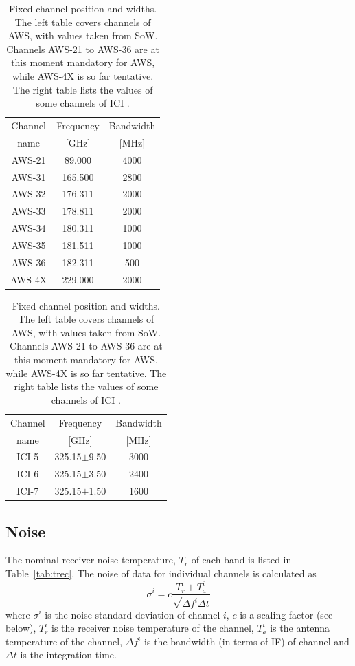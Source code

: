 \documentclass[12pt]{article}
\begin{document}
\begin{table}[!b]
  \begin{minipage}[b]{0.5\linewidth}
  \centering  
  \begin{tabular}[c]{c|c|c}
    Channel & Frequency   & Bandwidth \\
    name    & [GHz] &  [MHz] \\
    \hline
    AWS-21  & \phantom{0}89.000 & 4000\\
    AWS-31  & 165.500 & 2800\\
    AWS-32  & 176.311 & 2000\\
    AWS-33  & 178.811 & 2000\\
    AWS-34  & 180.311 & 1000\\
    AWS-35  & 181.511 & 1000\\
    AWS-36  & 182.311 & \phantom{0}500\\
    AWS-4X  & 229.000 & 2000\\
    \hline
  \end{tabular}
  \end{minipage}%
  \begin{minipage}[b]{0.5\linewidth}
  \centering  
  \begin{tabular}[c]{c|c|c}
    Channel & Frequency   & Bandwidth \\
    name    & [GHz] &  [MHz] \\
    \hline
    ICI-5  & 325.15$\pm$9.50 & 3000\\
    ICI-6  & 325.15$\pm$3.50 & 2400\\
    ICI-7  & 325.15$\pm$1.50 & 1600\\
    \hline
  \end{tabular}
  \end{minipage}  
  \caption{Fixed channel position and widths. The left table covers channels of
    AWS, with values taken from SoW. Channels AWS-21 to AWS-36 are at this
    moment mandatory for AWS, while AWS-4X is so far tentative. The right table
    lists the values of some channels of ICI \citep{eriksson:towar:20}.}
  \label{tab:fixed:chs}
\end{table}


\subsection{Noise}
%
The nominal receiver noise temperature, $T_r$ of each band is listed in
Table~\ref{tab:trec}. The noise of data for individual channels is calculated
as
\begin{equation}
  \sigma^i = c \frac{T^i_r+T^i_a}{\sqrt{\Delta\!f^i\Delta t}}
  \label{eq:noise}
\end{equation}
where $\sigma^i$ is the noise standard deviation of channel $i$, $c$ is a
scaling factor (see below), $T^i_r$ is the receiver noise temperature of the
channel, $T^i_a$ is the antenna temperature of the channel, $\Delta\!f^i$ is
the bandwidth (in terms of IF) of channel and $\Delta t$ is the integration
time.
\end{document}
